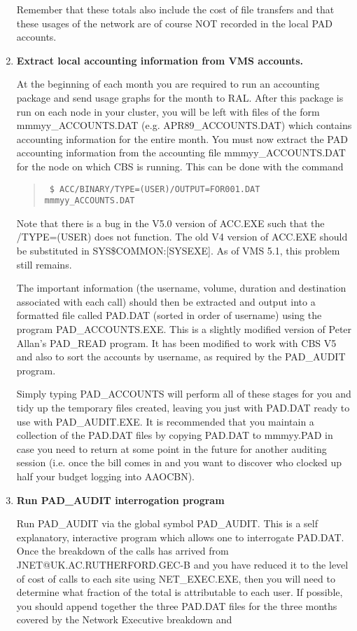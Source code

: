\begin{enumerate}
Remember that these totals also include the cost of file transfers and that
these usages of the network are of course NOT recorded in the local PAD
accounts.


\item {\bf Extract local accounting information from VMS accounts.}

At the beginning of each month you are required to run an accounting
package and send usage graphs for the month to RAL. After this package is
run on each node in your cluster, you will be left with files of the form
mmmyy\_\/ACCOUNTS.DAT (e.g. APR89\_\/ACCOUNTS.DAT) which contains accounting
information for the entire month. You must now extract the PAD accounting
information from the accounting file mmmyy\_\/ACCOUNTS.DAT for the node on
which CBS is running. This can be done with the command

\begin{quote} \tt
\$ ACC/BINARY/TYPE=(USER)/OUTPUT=FOR001.DAT mmmyy\_\/ACCOUNTS.DAT
\end{quote}

Note that there is a bug in the V5.0 version of ACC.EXE such that the
/TYPE=(USER) does not function. The old V4 version of ACC.EXE should be
substituted in SYS\$COMMON:[SYSEXE]. As of VMS 5.1, this problem still
remains.

The important information (the username, volume, duration and destination
associated with each call) should then be extracted and output into a
formatted file called PAD.DAT (sorted in order of username) using the
program PAD\_\/ACCOUNTS.EXE. This is a slightly modified version of Peter
Allan's PAD\_\/READ program. It has been modified to work with CBS V5 and also
to sort the accounts by username, as required by the PAD\_\/AUDIT program.

Simply typing PAD\_\/ACCOUNTS will perform all of these stages
for you and tidy up the temporary files created, leaving you just with
PAD.DAT ready to use with PAD\_\/AUDIT.EXE. It is recommended that you maintain
a collection of the PAD.DAT files by copying PAD.DAT to mmmyy.PAD in case
you need to return at some point in the future for another auditing session
(i.e. once the bill comes in and you want to discover who clocked up half
your budget logging into AAOCBN).

\item {\bf Run PAD\_\/AUDIT interrogation program}

Run PAD\_\/AUDIT via the global symbol PAD\_\/AUDIT. This is a self explanatory,
interactive program which allows one to interrogate PAD.DAT. Once the breakdown
of the calls has arrived from JNET@UK.AC.RUTHERFORD.GEC-B and you have reduced
it to the level of cost of calls to each site using NET\_\/EXEC.EXE, then you
will need to determine what fraction of the total is attributable to each user.
If possible, you should append together the three PAD.DAT files for the three
months covered by the Network Executive breakdown and


\end{enumerate}
